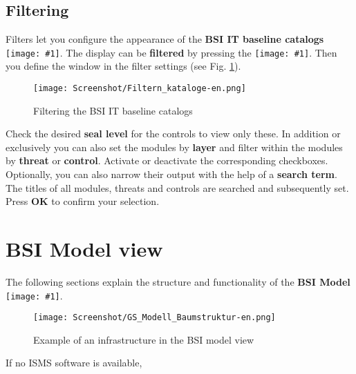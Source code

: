 \documentclass[a4paper,10pt]{book}
\newcommand{\icon}[1]{\texttt{[image: \#1]}}
\begin{document}
\subsection{Filtering}
Filters let you configure the appearance of the \textbf{BSI IT baseline catalogs} \icon{Icon/GS_Kataloge.png}.
The display can be \textbf{filtered} by pressing the \icon{Icon/Filter.png}.
Then you define the window in the filter settings (see Fig. \ref{Filtering the BSI IT baseline catalogs}).
\newline
\begin{figure}[htb!]
  \centering
  \texttt{[image: Screenshot/Filtern\_kataloge-en.png]}
  \caption{\label{Filtering the BSI IT baseline catalogs} Filtering the BSI IT baseline catalogs}
\end{figure}
\newline
Check the desired \textbf{seal level} for the controls to view only these.
\newline
In addition or exclusively you can also set the modules by \textbf{layer} and filter within the modules by \textbf{threat} or \textbf{control}.
Activate or deactivate the corresponding checkboxes. Optionally, you can also narrow their output with the help of a \textbf{search term}. The titles of all modules, threats and controls are searched and subsequently set. Press \textbf{OK} to confirm your selection.

\section{BSI Model view}
The following sections explain the structure and functionality of the \textbf{BSI Model}
\icon{Icon/GS_Modell.png}.

\begin{figure}[htb!]
  \centering
  \texttt{[image: Screenshot/GS\_Modell\_Baumstruktur-en.png]}
  \caption{\label{Example of an ifrastructure in the BSI model view} Example of an infrastructure in the BSI model view}
\end{figure}
If no ISMS software is available,
\end{document}
